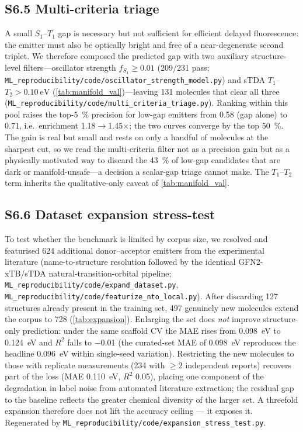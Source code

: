 \documentclass[twoside,twocolumn,9pt]{extarticle}
\begin{document}
\subsection*{S6.5 Multi-criteria triage}
A small $S_1$--$T_1$ gap is necessary but not sufficient for efficient delayed
fluorescence: the emitter must also be optically bright and free of a near-degenerate
second triplet. We therefore composed the predicted gap with two auxiliary structure-level
filters---oscillator strength $f_{S_1}\ge\num{0.01}$ (\num{209}/\num{231} pass;
\texttt{ML\_reproducibility/code/oscillator\_strength\_model.py}) and sTDA $T_1$--$T_2 > \qty{0.10}{\electronvolt}$
(\cref{tab:manifold_val})---leaving \num{131} molecules that clear all three
(\texttt{ML\_reproducibility/code/multi\_criteria\_triage.py}). Ranking within this pool raises the top-\qty{5}{\percent}
precision for low-gap emitters from \num{0.58} (gap alone) to \num{0.71}, i.e.\ enrichment
\num{1.18}$\rightarrow$\num{1.45}$\times$; the two curves converge by the top \qty{50}{\percent}.
The gain is real but small and rests on only a handful of molecules at the sharpest cut, so we
read the multi-criteria filter not as a precision gain but as a physically motivated way
to discard the \qty{43}{\percent} of low-gap candidates that are dark or manifold-unsafe---a
decision a scalar-gap triage cannot make. The $T_1$--$T_2$ term inherits the qualitative-only
caveat of \cref{tab:manifold_val}.

\subsection*{S6.6 Dataset expansion stress-test}
To test whether the benchmark is limited by corpus size, we resolved and featurised
\num{624} additional donor--acceptor emitters from the experimental literature
(name-to-structure resolution followed by the identical GFN2-xTB/sTDA natural-transition-orbital
pipeline; \texttt{ML\_reproducibility/code/expand\_dataset.py}, \texttt{ML\_reproducibility/code/featurize\_nto\_local.py}). After
discarding \num{127} structures already present in the training set, \num{497} genuinely new
molecules extend the corpus to \num{728} (\cref{tab:expansion}). Enlarging the set does
\emph{not} improve structure-only prediction: under the same scaffold CV the MAE rises from
\qty{0.098}{\electronvolt} to \qty{0.124}{\electronvolt} and $R^2$ falls to \num{-0.01} (the
curated-set MAE of \qty{0.098}{\electronvolt} reproduces the headline \qty{0.096}{\electronvolt}
within single-seed variation). Restricting the new molecules to those with replicate
measurements (\num{234} with $\ge\num{2}$ independent reports) recovers part of the loss
(MAE \qty{0.110}{\electronvolt}, $R^2$ \num{0.05}), placing one component of the degradation in
label noise from automated literature extraction; the residual gap to the baseline reflects the
greater chemical diversity of the larger set. A threefold expansion therefore does not lift the
accuracy ceiling --- it exposes it. Regenerated by \texttt{ML\_reproducibility/code/expansion\_stress\_test.py}.
\end{document}
